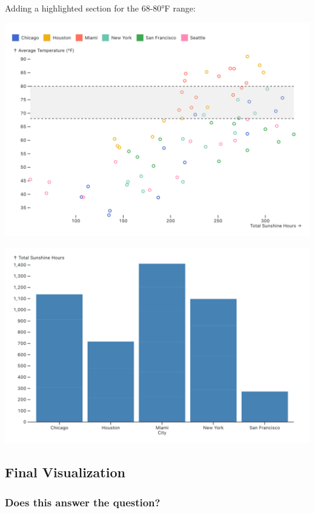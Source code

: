 \documentclass{article}
\begin{document}
\pagebreak

Adding a highlighted section for the 68-80°F range:

\begin{center}
    \includegraphics[scale=0.2]{scatter2.png}
\end{center}

\begin{center}
    \includegraphics[width=\textwidth]{filter.png}
\end{center}

\subsection{Final Visualization}
\subsubsection{Does this answer the question?}
\end{document}
